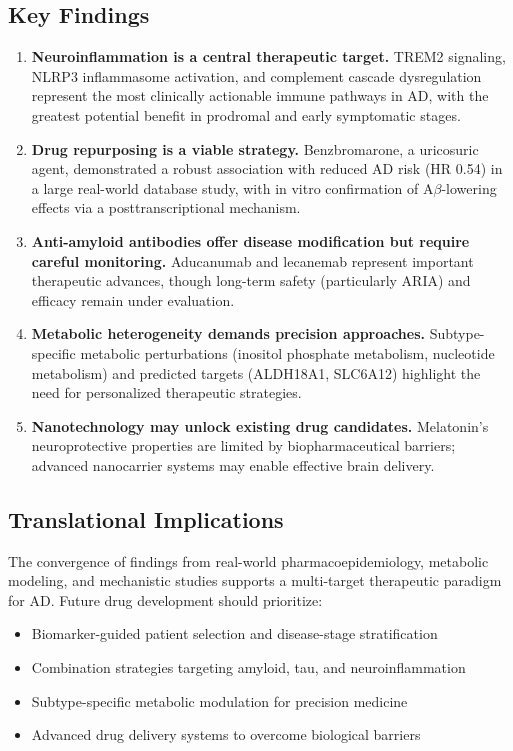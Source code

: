 \documentclass[11pt, a4paper]{article}
\begin{document}
\subsection{Key Findings}
\begin{enumerate}
    \item \textbf{Neuroinflammation is a central therapeutic target.} TREM2 signaling, NLRP3 inflammasome activation, and complement cascade dysregulation represent the most clinically actionable immune pathways in AD, with the greatest potential benefit in prodromal and early symptomatic stages.
    
    \item \textbf{Drug repurposing is a viable strategy.} Benzbromarone, a uricosuric agent, demonstrated a robust association with reduced AD risk (HR 0.54) in a large real-world database study, with in vitro confirmation of A$\beta$-lowering effects via a posttranscriptional mechanism.
    
    \item \textbf{Anti-amyloid antibodies offer disease modification but require careful monitoring.} Aducanumab and lecanemab represent important therapeutic advances, though long-term safety (particularly ARIA) and efficacy remain under evaluation.
    
    \item \textbf{Metabolic heterogeneity demands precision approaches.} Subtype-specific metabolic perturbations (inositol phosphate metabolism, nucleotide metabolism) and predicted targets (ALDH18A1, SLC6A12) highlight the need for personalized therapeutic strategies.
    
    \item \textbf{Nanotechnology may unlock existing drug candidates.} Melatonin's neuroprotective properties are limited by biopharmaceutical barriers; advanced nanocarrier systems may enable effective brain delivery.
\end{enumerate}

\subsection{Translational Implications}
The convergence of findings from real-world pharmacoepidemiology, metabolic modeling, and mechanistic studies supports a multi-target therapeutic paradigm for AD. Future drug development should prioritize:
\begin{itemize}
    \item Biomarker-guided patient selection and disease-stage stratification
    \item Combination strategies targeting amyloid, tau, and neuroinflammation
    \item Subtype-specific metabolic modulation for precision medicine
    \item Advanced drug delivery systems to overcome biological barriers
\end{itemize}
\end{document}

